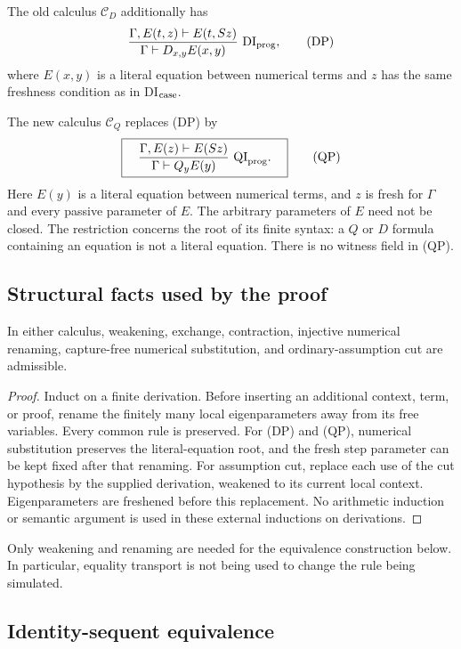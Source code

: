 The old calculus $\mathcal C_D$ additionally has
\[
 \frac{\Gamma,E(t,z)\vdash E(t,Sz)}
      {\Gamma\vdash D_{x,y}E(x,y)}\ \mathrm{DI}_{\rm prog},
 \tag{DP}
\]
where $E(x,y)$ is a literal equation between numerical terms and $z$ has
the same freshness condition as in DI$_{\rm case}$.

The new calculus $\mathcal C_Q$ replaces (DP) by
\[
 \boxed{\quad
 \frac{\Gamma,E(z)\vdash E(Sz)}
      {\Gamma\vdash Q_yE(y)}\ \mathrm{QI}_{\rm prog}.
 \quad}
 \tag{QP}
\]
Here $E(y)$ is a literal equation between numerical terms, and $z$ is
fresh for $\Gamma$ and every passive parameter of $E$.  The arbitrary
parameters of $E$ need not be closed.  The restriction concerns the root
of its finite syntax: a $Q$ or $D$ formula containing an equation is not
a literal equation.  There is no witness field in (QP).

\subsection{Structural facts used by the proof}

\begin{lemma}
In either calculus, weakening, exchange, contraction, injective numerical
renaming, capture-free numerical substitution, and ordinary-assumption
cut are admissible.
\end{lemma}
\begin{proof}
Induct on a finite derivation.  Before inserting an additional context,
term, or proof, rename the finitely many local eigenparameters away from
its free variables.  Every common rule is preserved.  For (DP) and (QP),
numerical substitution preserves the literal-equation root, and the fresh
step parameter can be kept fixed after that renaming.  For assumption
cut, replace each use of the cut hypothesis by the supplied derivation,
weakened to its current local context.  Eigenparameters are freshened
before this replacement.  No arithmetic induction or semantic argument
is used in these external inductions on derivations.
\end{proof}

Only weakening and renaming are needed for the equivalence construction
below.  In particular, equality transport is not being used to change
the rule being simulated.

\subsection{Identity-sequent equivalence}

